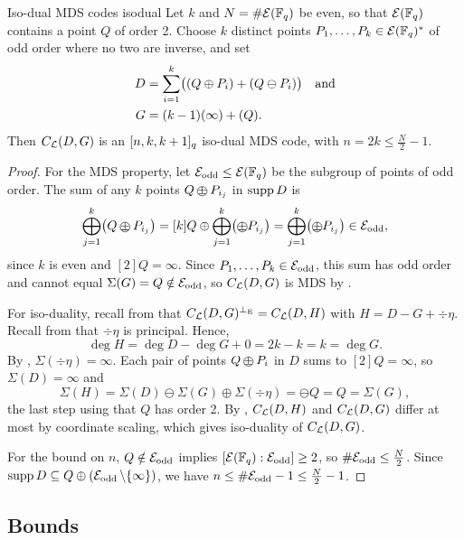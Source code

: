 \documentclass[twocolumn, 11pt]{scrartcl}
\begin{document}
\begin{construction}{Iso-dual MDS codes \cite{zhu2026isodual}}{isodual}
    Let $k$ and $N=\#\mcE(\bbF_q)$ be even, so that $\mcE(\bbF_q)$ contains a point $Q$ of order 2. Choose $k$ distinct points $P_1,\hdots,P_k\in\mcE(\bbF_q)^*$ of odd order where no two are inverse, and set
    \begin{align*}
        D&=\sum_{i=1}^{k}\pa[\big]{(Q\oplus P_i)+(Q\ominus P_i)}\quad\text{and} \\
        G&=(k-1)(\infty)+(Q).
    \end{align*}
    Then $C_\mcL(D,G)$ is an $\br{n,k,k+1}_q$ iso-dual MDS code, with $n=2k\leq \frac N2-1$.
\end{construction}

\begin{proof}
For the MDS property, let $\mcE_\mathrm{odd}\leq\mcE(\bbF_q)$ be the subgroup of points of odd order. The sum of any $k$ points $Q\opm P_{i_j}$ in $\supp D$ is
\vspace{-3pt}
\[ \bigoplus_{j=1}^k \pa[\big]{Q\opm P_{i_j}}=[k]Q\oplus\bigoplus_{j=1}^k \pa[\big]{\opm P_{i_j}}=\bigoplus_{j=1}^k \pa[\big]{\opm P_{i_j}}\in\mcE_\mathrm{odd}, \]
since $k$ is even and $[2]Q=\infty$. Since $P_1,\hdots,P_k\in\mcE_\mathrm{odd}$, this sum has odd order and cannot equal $\Sigma(G)=Q\notin\mcE_\mathrm{odd}$, so $C_\mcL(D,G)$ is MDS by .

For iso-duality, recall from  that $C_\mcL(D,G)^{\perp_\rmE}=C_\mcL(D,H)$ with $H=D-G+\div\eta$. Recall from  that $\div\eta$ is principal. Hence,
\[ \deg H=\deg D-\deg G+0=2k-k=k=\deg G. \]
By , $\Sigma(\div\eta)=\infty$. Each pair of points $Q\opm P_i$ in $D$ sums to $[2]Q=\infty$, so $\Sigma(D)=\infty$ and
\[ \Sigma(H)=\Sigma(D)\ominus\Sigma(G)\oplus\Sigma(\div\eta)=\ominus Q=Q=\Sigma(G), \]
the last step using that $Q$ has order 2. By , $C_\mcL(D,H)$ and $C_\mcL(D,G)$ differ at most by coordinate scaling, which gives iso-duality of $C_\mcL(D,G)$.

For the bound on $n$, $Q\notin\mcE_\mathrm{odd}$ implies $[\mcE(\bbF_q):\mcE_\mathrm{odd}]\geq2$, so $\#\mcE_\mathrm{odd}\leq \frac N2$. Since $\supp D\subseteq Q\oplus(\mcE_\mathrm{odd}\bs\set\infty)$, we have $n\leq\#\mcE_\mathrm{odd}-1\leq \frac N2-1$.
\end{proof}

\subsection{Bounds}
\end{document}
